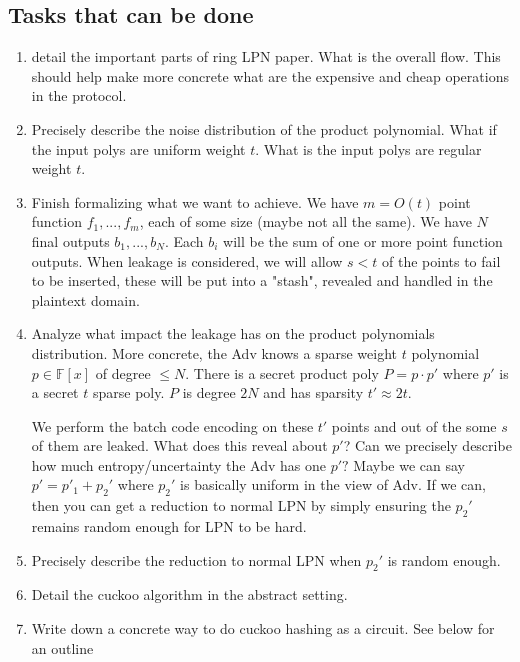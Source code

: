 \subsection{Tasks that can be done}
\begin{enumerate}
  \item detail the important parts of ring LPN paper. What is the overall flow. This should help make more concrete what are the expensive and cheap operations in the protocol.

  \item Precisely describe the noise distribution of the product polynomial. What if the input polys are uniform weight $t$. What is the input polys are regular weight $t$.


  \item Finish formalizing what we want to achieve. We have $m=O(t)$ point function $f_1,...,f_{m}$, each of some size (maybe not all the same). We have $N$ final outputs $b_1,...,b_N$. Each $b_i$ will be the sum of one or more point function outputs. When leakage is considered, we will allow  $s<t$ of the points to fail to be inserted, these will be put into a "stash", revealed and handled in the plaintext domain.

  \item Analyze what impact the leakage has on the product polynomials distribution. More concrete, the Adv knows a sparse weight $t$ polynomial $p\in \mathbb{F}[x]$ of degree $\leq N$. There is a secret product poly $P=p \cdot p'$ where $p'$ is a secret $t$ sparse poly. $P$ is degree $2N$ and has sparsity $t'\approx 2t$.

    We perform the batch code encoding on these $t'$ points and out of the some $s$ of them are leaked. What does this reveal about $p'$? Can we precisely describe how much entropy/uncertainty the Adv has one $p'?$ Maybe we can say $p'=p'_1+p_2'$ where $p_2'$ is basically uniform in the view of Adv. If we can, then you can get a reduction to normal LPN by simply ensuring the $p_2'$ remains random enough for LPN to be hard.

  \item Precisely describe the reduction to normal LPN when $p_2'$ is random enough.

  \item Detail the cuckoo algorithm in the abstract setting.

  \item Write down a concrete way to do cuckoo hashing as a circuit. See below for an outline


\end{enumerate}
